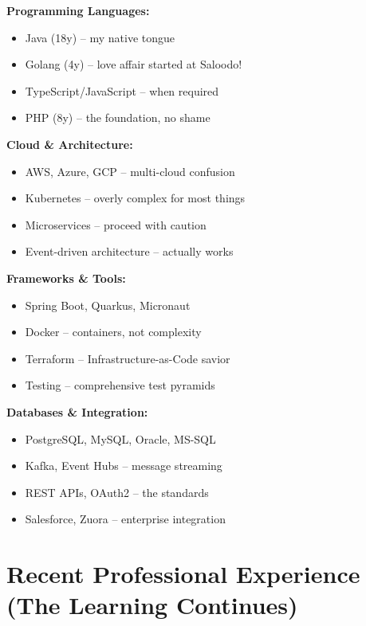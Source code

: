 \documentclass[11pt,a4paper]{article}
\begin{document}
\begin{multicols}{2}
\textbf{Programming Languages:}
\begin{itemize}[leftmargin=10pt, topsep=0pt, itemsep=0pt]
\item Java (18y) -- my native tongue
\item Golang (4y) -- love affair started at Saloodo!
\item TypeScript/JavaScript -- when required
\item PHP (8y) -- the foundation, no shame
\end{itemize}

\textbf{Cloud \& Architecture:}
\begin{itemize}[leftmargin=10pt, topsep=0pt, itemsep=0pt]
\item AWS, Azure, GCP -- multi-cloud confusion
\item Kubernetes -- overly complex for most things
\item Microservices -- proceed with caution
\item Event-driven architecture -- actually works
\end{itemize}

\textbf{Frameworks \& Tools:}
\begin{itemize}[leftmargin=10pt, topsep=0pt, itemsep=0pt]
\item Spring Boot, Quarkus, Micronaut
\item Docker -- containers, not complexity
\item Terraform -- Infrastructure-as-Code savior
\item Testing -- comprehensive test pyramids
\end{itemize}

\textbf{Databases \& Integration:}
\begin{itemize}[leftmargin=10pt, topsep=0pt, itemsep=0pt]
\item PostgreSQL, MySQL, Oracle, MS-SQL
\item Kafka, Event Hubs -- message streaming
\item REST APIs, OAuth2 -- the standards
\item Salesforce, Zuora -- enterprise integration
\end{itemize}
\end{multicols}

\newpage

\section{Recent Professional Experience (The Learning Continues)}
\end{document}
